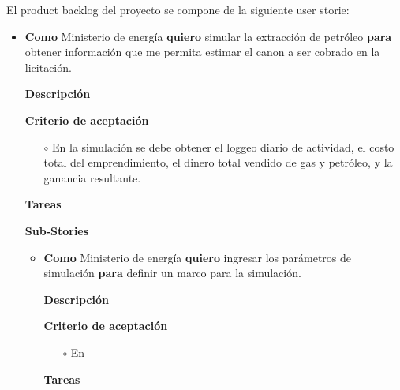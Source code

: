 \documentclass[a4paper]{article}
\newenvironment{stories}{
  \begin{itemize}
}{
  \end{itemize}
}
\newcommand{\story}[3]{
  \item
   \textbf{Como} #1 \textbf{quiero} #2 \textbf{para} #3.
}
\begin{document}
El product backlog del proyecto se compone de la siguiente user storie:
\begin{stories}
  \story{Ministerio de energía}
        {simular la extracción de petróleo}
        {obtener información que me permita estimar el canon a ser cobrado en la licitación}

  \medskip
\textbf{Descripción}

\medskip
\textbf{Criterio de aceptación}

\begin{itemize}
  \item[$\circ$] En la simulación se debe obtener el loggeo diario  de actividad, el costo total del emprendimiento, el dinero total vendido de gas y petróleo, y la ganancia resultante.
 
  \end{itemize}

  \medskip
\textbf{Tareas}




  \medskip
\textbf{Sub-Stories}
\begin{stories}
\story{Ministerio de energía}
        {ingresar los parámetros de simulación}
        {definir un marco para la simulación}
        
        \medskip
\textbf{Descripción}

\medskip
\textbf{Criterio de aceptación}

\begin{itemize}
  \item[$\circ$] En
 
  \end{itemize}

  \medskip
\textbf{Tareas}  
        
\end{stories}

\end{stories}





%










\end{document}
